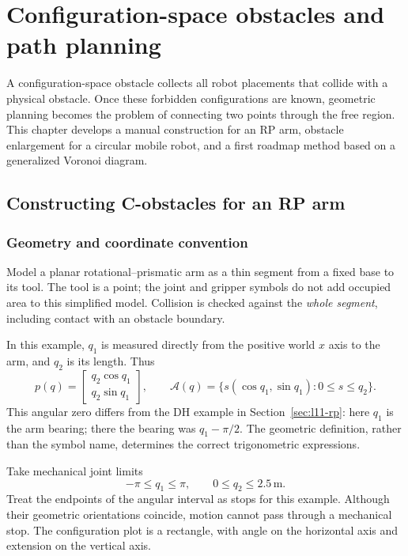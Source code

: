 \chapter{Configuration-space obstacles and path planning}
\label{chap:lecture13}
A configuration-space obstacle collects all robot placements that collide
with a physical obstacle. Once these forbidden configurations are known,
geometric planning becomes the problem of connecting two points through
the free region. This chapter develops a manual construction for an RP
arm, obstacle enlargement for a circular mobile robot, and a first roadmap
method based on a generalized Voronoi diagram.

\section{Constructing C-obstacles for an RP arm}
\subsection{Geometry and coordinate convention}
Model a planar rotational--prismatic arm as a thin segment from a fixed
base to its tool. The tool is a point; the joint and gripper symbols do not
add occupied area to this simplified model. Collision is checked against
the \emph{whole segment}, including contact with an obstacle boundary.

In this example, $q_1$ is measured directly from the positive world $x$
axis to the arm, and $q_2$ is its length. Thus
\begin{equation}
 p(q)=\begin{bmatrix}q_2\cos q_1\\q_2\sin q_1\end{bmatrix},\qquad
 \mathcal A(q)=\{s(\cos q_1,\sin q_1):0\le s\le q_2\}.
 \label{eq:l13-rp}
\end{equation}
This angular zero differs from the DH example in
Section~\ref{sec:l11-rp}: here $q_1$ is the arm bearing; there the bearing
was $q_1-\pi/2$. The geometric definition, rather than the symbol name,
determines the correct trigonometric expressions.

Take mechanical joint limits
\[
 -\pi\le q_1\le\pi,\qquad 0\le q_2\le2.5\,\mathrm m.
\]
Treat the endpoints of the angular interval as stops for this example.
Although their geometric orientations coincide, motion cannot pass through
a mechanical stop. The configuration plot is a rectangle, with angle on
the horizontal axis and extension on the vertical axis.

